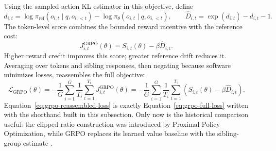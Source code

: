 Using the sampled-action KL estimator in this objective, define
\begin{equation}
  d_{i,t}
  =\log\pi_{\mathrm{ref}}(o_{i,t}\mid q,o_{i,<t})
   -\log\pi_\theta(o_{i,t}\mid q,o_{i,<t}),
  \qquad
  \widehat D_{i,t}=\exp(d_{i,t})-d_{i,t}-1.
  \label{eq:grpo-sampled-kl}
\end{equation}
The token-level score combines the bounded reward incentive with the reference cost:
\begin{equation}
  J_{i,t}^{\mathrm{GRPO}}(\theta)
  =S_{i,t}(\theta)-\beta\widehat D_{i,t}.
  \label{eq:grpo-token-objective}
\end{equation}
Higher reward credit improves this score; greater reference drift reduces it. Averaging
over tokens and sibling responses, then negating because software minimizes losses,
reassembles the full objective:
\begin{equation}
  \mathcal{L}_{\mathrm{GRPO}}(\theta)
  =-\frac{1}{G}\sum_{i=1}^{G}\frac{1}{T_i}\sum_{t=1}^{T_i}
    J_{i,t}^{\mathrm{GRPO}}(\theta)
  =-\frac{1}{G}\sum_{i=1}^{G}\frac{1}{T_i}\sum_{t=1}^{T_i}
    \left(S_{i,t}(\theta)-\beta\widehat D_{i,t}\right).
  \label{eq:grpo-reassembled-loss}
\end{equation}
Equation~\ref{eq:grpo-reassembled-loss} is exactly
Equation~\ref{eq:grpo-full-loss} written with the shorthand built in this subsection.
Only now is the historical comparison useful: the clipped ratio construction was
introduced by Proximal Policy Optimization, while GRPO replaces its learned value
baseline with the sibling-group estimate \citep{schulman2017ppo}.
